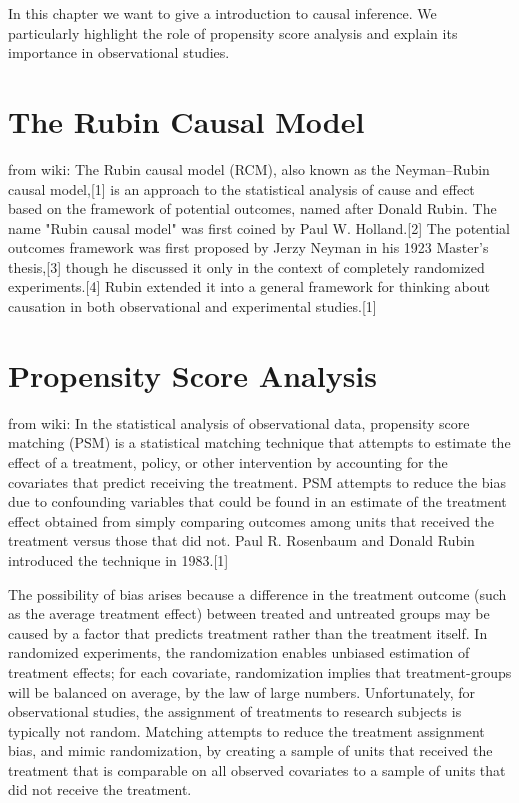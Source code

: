 In this chapter we want to give a introduction to causal inference.
We particularly highlight the role of propensity score analysis and explain its importance in observational studies.


\section{The Rubin Causal Model}
from wiki:
The Rubin causal model (RCM), also known as the Neyman–Rubin causal model,[1] is an approach to the statistical analysis of cause and effect based on the framework of potential outcomes, named after Donald Rubin. The name "Rubin causal model" was first coined by Paul W. Holland.[2] The potential outcomes framework was first proposed by Jerzy Neyman in his 1923 Master's thesis,[3] though he discussed it only in the context of completely randomized experiments.[4] Rubin extended it into a general framework for thinking about causation in both observational and experimental studies.[1]
\section{Propensity Score Analysis}
from wiki:
In the statistical analysis of observational data, propensity score matching (PSM) is a statistical matching technique that attempts to estimate the effect of a treatment, policy, or other intervention by accounting for the covariates that predict receiving the treatment. PSM attempts to reduce the bias due to confounding variables that could be found in an estimate of the treatment effect obtained from simply comparing outcomes among units that received the treatment versus those that did not. Paul R. Rosenbaum and Donald Rubin introduced the technique in 1983.[1]

The possibility of bias arises because a difference in the treatment outcome (such as the average treatment effect) between treated and untreated groups may be caused by a factor that predicts treatment rather than the treatment itself. In randomized experiments, the randomization enables unbiased estimation of treatment effects; for each covariate, randomization implies that treatment-groups will be balanced on average, by the law of large numbers. Unfortunately, for observational studies, the assignment of treatments to research subjects is typically not random. Matching attempts to reduce the treatment assignment bias, and mimic randomization, by creating a sample of units that received the treatment that is comparable on all observed covariates to a sample of units that did not receive the treatment.

